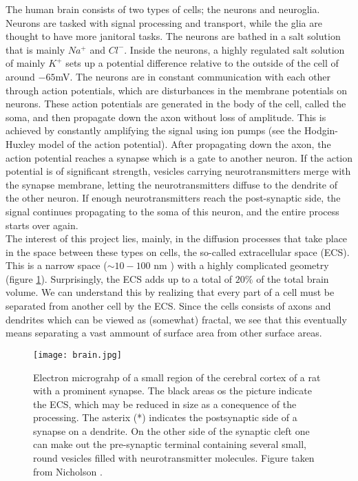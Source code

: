 \documentclass[a4paper,english, 12pt, twoside]{article}
\begin{document}
The human brain consists of two types of cells; the neurons and neuroglia. 
Neurons are tasked with signal processing and transport, while the glia are thought to have more janitoral tasks. 
The neurons are bathed in a salt solution that is mainly $Na^+$ and $Cl^-$. 
Inside the neurons, a highly regulated salt solution of mainly $K^+$ sets up a potential difference relative to the outside of the cell of around $-65$mV.
The neurons are in constant communication with each other through action potentials, which are disturbances in the membrane potentials on neurons. 
These action potentials are generated in the body of the cell, called the soma, and then propagate down the axon without loss of amplitude. 
This is achieved by constantly amplifying the signal using ion pumps (see the Hodgin-Huxley model of the action potential).
After propagating down the axon, the action potential reaches a synapse which is a gate to another neuron. 
If the action potential is of significant strength, vesicles carrying neurotransmitters merge with the synapse membrane, letting the neurotransmitters diffuse to the dendrite of the other neuron. 
If enough neurotransmitters reach the post-synaptic side, the signal continues propagating to the soma of this neuron, and the entire process starts over again. \\
The interest of this project lies, mainly, in the diffusion processes that take place in the space between these types on cells, the so-called extracellular space (ECS). 
This is a narrow space ($\sim 10-100$ nm \cite{nicholson2001diffusion}) with a highly complicated geometry (figure \ref{ECS}). 
Surprisingly, the ECS adds up to a total of $20\%$ of the total brain volume. 
We can understand this by realizing that every part of a cell must be separated from another cell by the ECS. 
Since the cells consists of axons and dendrites which can be viewed as (somewhat) fractal, we see that this eventually means separating a vast ammount of surface area from other surface areas.

\begin{figure}[H]
 \centering
 \texttt{[image: brain.jpg]}
 \caption{Electron micrograhp of a small region of the cerebral cortex of a rat with a prominent synapse. 
 The black areas os the picture indicate the ECS, which may be reduced in size as a conequence of the processing. 
 The asterix (*) indicates the postsynaptic side of a synapse on a dendrite. 
 On the other side of the synaptic cleft one can make out the pre-synaptic terminal containing several small, round vesicles filled with neurotransmitter molecules. 
 Figure taken from Nicholson \cite{nicholson2001diffusion}.}
 \label{ECS}
\end{figure}
\end{document}
